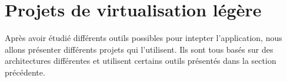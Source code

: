 \section{Projets de virtualisation légère}
\label{section:sota}

Après avoir étudié différents outils possibles pour intepter l'application, nous allons présenter différents projets qui l'utilisent. Ils sont tous basés sur des architectures différentes et utilisent certains outils présentés dans la section précédente.
